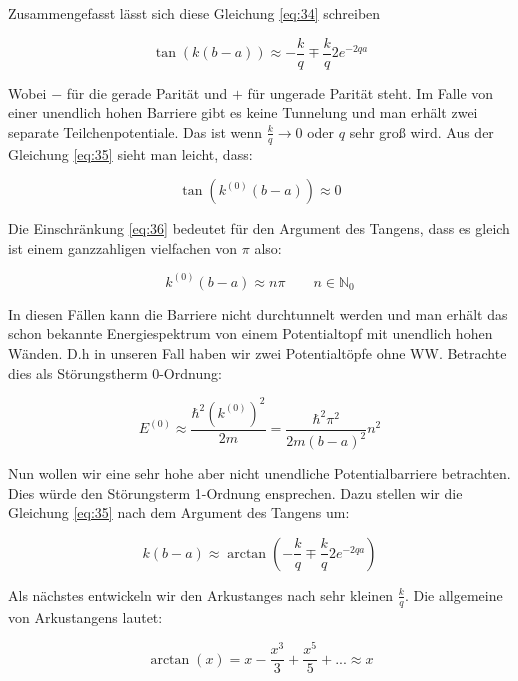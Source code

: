 Zusammengefasst lässt sich diese Gleichung \eqref{eq:34} schreiben

\begin{equation}
  \label{eq:35}
  \tan(k(b-a)) \approx - \frac{k}{q} \mp \frac{k}{q} 2e^{-2qa}
\end{equation}

Wobei \(-\) für die gerade Parität und \(+\) für ungerade Parität steht. Im Falle von einer unendlich hohen Barriere gibt es keine Tunnelung und man erhält zwei separate Teilchenpotentiale. Das ist wenn \(\frac{k}{q}\to 0\) oder \(q\) sehr groß wird. Aus der Gleichung \eqref{eq:35} sieht man leicht, dass:


\begin{equation}
  \label{eq:36}
  \tan(k^{(0)}(b-a)) \approx 0
\end{equation}

Die Einschränkung \eqref{eq:36} bedeutet für den Argument des Tangens, dass es gleich ist einem ganzzahligen vielfachen von \(\pi\) also:

\begin{equation}
  \label{eq:37}
  k^{(0)}(b-a) \approx n\pi \qquad n\in \mathbb N_0
\end{equation}

In diesen Fällen kann die Barriere nicht durchtunnelt werden und man erhält das schon bekannte Energiespektrum von einem Potentialtopf mit unendlich hohen Wänden. D.h in unseren Fall haben wir zwei Potentialtöpfe ohne WW. Betrachte dies als Störungstherm 0-Ordnung:

\begin{equation}
  \label{eq:38}
  E^{(0)} \approx \frac{ \hbar^2 (k^{(0)})^2}{2m } = \frac{ \hbar^2\pi^2 }{2m(b-a)^2 }n^2
\end{equation}

Nun wollen wir eine sehr hohe aber nicht unendliche Potentialbarriere betrachten. Dies würde den Störungsterm 1-Ordnung ensprechen. Dazu stellen wir die Gleichung \eqref{eq:35} nach dem Argument des Tangens um:

\begin{equation}
  \label{eq:39}
    k(b-a) \approx \arctan\left( - \frac{k}{q} \mp \frac{k}{q} 2e^{-2qa}\right)
\end{equation}

Als nächstes entwickeln wir den Arkustanges nach sehr kleinen \(\frac{k}{q}\). Die allgemeine von Arkustangens lautet:

\begin{equation}
  \label{eq:40}
  \arctan(x) = x - \frac{x^3}{3} + \frac{x^5}{5}+...\approx x
\end{equation}

